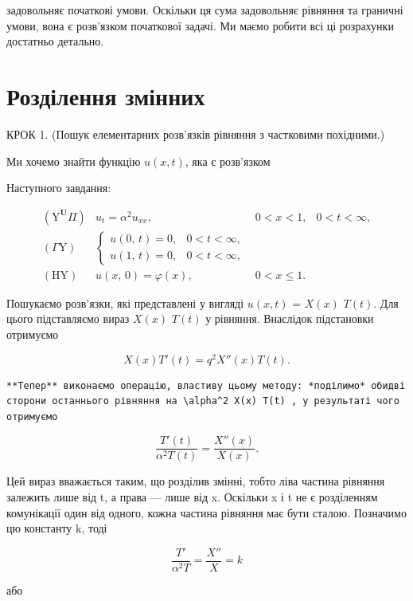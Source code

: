 \documentclass[
  ukrainian,
]{article}
\begin{document}
задовольняє початкові умови. Оскільки ця сума задовольняє рівняння та
граничні умови, вона є розв'язком початкової задачі. Ми маємо робити всі
ці розрахунки достатньо детально.

\section{Розділення
змінних}\label{ux440ux43eux437ux434ux456ux43bux435ux43dux43dux44f-ux437ux43cux456ux43dux43dux438ux445}

КРОК 1. (Пошук елементарних розв'язків рівняння з частковими похідними.)

Ми хочемо знайти функцію \(u(x, t)\), яка є розв'язком

Наступного завдання:

\[
\begin{array}{ll} (\mathrm{Y}^{\mathbf{U}}\Pi) & u_t = \alpha^2 u_{xx}, & 0 < x < 1, & 0 < t < \infty, \\ (\Gamma \mathrm{Y}) & \begin{cases} u\left(0,\,t\right) = 0, & 0 < t < \infty, \\ u\left(1,\,t\right) = 0, & 0 < t < \infty, \end{cases} \\ (\mathrm{H}\mathrm{Y}) & u\left(x,\,0\right) = \varphi\left(x\right), & 0 < x \leq 1. \end{array}
\]

Пошукаємо розв'язки, які представлені у вигляді \(u(x, t)\) = \(X(x)\)
\(T(t)\). Для цього підставляємо вираз \(X(x)\) \(T(t)\) у рівняння.
Внаслідок підстановки отримуємо

\[
X(x) T'(t) = q^2 X''(x) T(t).
\]

\begin{verbatim}
**Тепер** виконаємо операцію, властиву цьому методу: *поділимо* обидві сторони останнього рівняння на \alpha^2 X(x) T(t) , у результаті чого отримуємо
\end{verbatim}

\[
\frac{T'(t)}{\alpha^2 T(t)} = \frac{X''(x)}{X(x)}.
\]

Цей вираз вважається таким, що розділив змінні, тобто ліва частина
рівняння залежить лише від t, а права --- лише від x. Оскільки x і t не
є розділенням комунікації один від одного, кожна частина рівняння має
бути сталою. Позначимо цю константу k, тоді

\[
\frac{T'}{\alpha^2 T} = \frac{X''}{X} = k
\]

або
\end{document}
